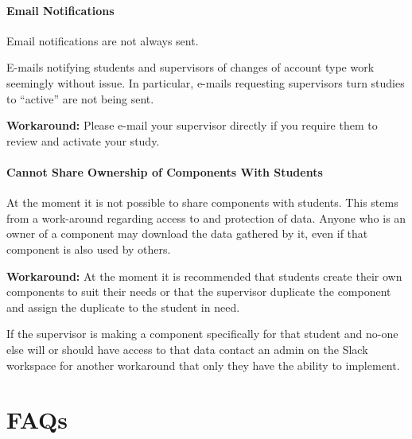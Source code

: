 \documentclass[]{book}
\begin{document}
\hypertarget{email-notifications}{%
\subsubsection*{Email Notifications}\label{email-notifications}}

Email notifications are not always sent.

E-mails notifying students and supervisors of changes of account type work seemingly without issue. In particular, e-mails requesting supervisors turn studies to ``active'' are not being sent.

\begin{workaround}
\textbf{Workaround:} Please e-mail your supervisor directly if you
require them to review and activate your study.
\end{workaround}

\hypertarget{cannot-share-ownership-of-components-with-students}{%
\subsubsection*{Cannot Share Ownership of Components With Students}\label{cannot-share-ownership-of-components-with-students}}

At the moment it is not possible to share components with students. This stems from a work-around regarding access to and protection of data. Anyone who is an owner of a component may download the data gathered by it, even if that component is also used by others.

\begin{workaround}
\textbf{Workaround:} At the moment it is recommended that students
create their own components to suit their needs or that the supervisor
duplicate the component and assign the duplicate to the student in need.

If the supervisor is making a component specifically for that student
and no-one else will or should have access to that data contact an admin
on the Slack workspace for another workaround that only they have the
ability to implement.
\end{workaround}

\hypertarget{faqs}{%
\chapter*{FAQs}\label{faqs}}
\end{document}
